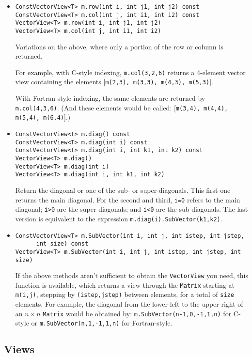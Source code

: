 \documentclass[twoside,letterpaper,11pt]{article}
\renewcommand{\tt}[1]{{\texttt {#1}}}
\begin{document}
\begin{itemize}
\item
\begin{verbatim}
ConstVectorView<T> m.row(int i, int j1, int j2) const
ConstVectorView<T> m.col(int j, int i1, int i2) const
VectorView<T> m.row(int i, int j1, int j2)
VectorView<T> m.col(int j, int i1, int i2) 
\end{verbatim}
Variations on the above, where only a portion of the row or column
is returned.  

For example, with C-style indexing, \tt{m.col(3,2,6)} returns a 4-element
vector view containing the elements
[\tt{m(2,3), m(3,3), m(4,3), m(5,3)}].

With Fortran-style indexing, the same elements are returned by \tt{m.col(4,3,6)}. 
(And these elements would be called: [\tt{m(3,4), m(4,4), m(5,4), m(6,4)}].)

\item
\begin{verbatim}
ConstVectorView<T> m.diag() const
ConstVectorView<T> m.diag(int i) const 
ConstVectorView<T> m.diag(int i, int k1, int k2) const
VectorView<T> m.diag()
VectorView<T> m.diag(int i)
VectorView<T> m.diag(int i, int k1, int k2)
\end{verbatim}
Return the diagonal or one of the sub- or super-diagonals.
This first one returns the main diagonal.  For the second and third,
\tt{i=0} refers to the main diagonal; \tt{i>0} are the super-diagonals;
and \tt{i<0} are the sub-diagonals.  The last version is equivalent to the
expression 
\tt{m.diag(i).SubVector(k1,k2)}.
\item
\begin{verbatim}
ConstVectorView<T> m.SubVector(int i, int j, int istep, int jstep, 
      int size) const
VectorView<T> m.SubVector(int i, int j, int istep, int jstep, int size) 
\end{verbatim}
If the above methods aren't sufficient to obtain the \tt{VectorView} you
need, this function is available, which returns a view through the \tt{Matrix} 
starting at \tt{m(i,j)}, stepping by \tt{(istep,jstep)} between elements,
for a total of \tt{size} elements.  For example, the diagonal
from the lower-left to the upper-right of an $n \times n$ \tt{Matrix} 
would be obtained by: \tt{m.SubVector(n-1,0,-1,1,n)} for C-style or
\tt{m.SubVector(n,1,-1,1,n)} for Fortran-style.

\end{itemize}


\subsection{Views}
\label{MViews}
\end{document}
